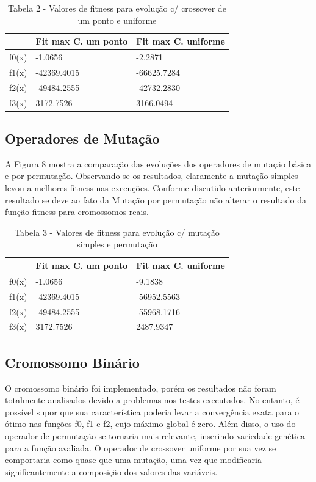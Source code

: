 \documentclass[conference]{IEEEtran}
\begin{document}
\begin{table}[]
\begin{tabular}{|l|l|l|}
\hline
      & Fit max C. um ponto & Fit max C. uniforme \\ \hline
f0(x) & -1.0656             & -2.2871             \\ \hline
f1(x) & -42369.4015         & -66625.7284         \\ \hline
f2(x) & -49484.2555         & -42732.2830         \\ \hline
f3(x) & 3172.7526           & 3166.0494           \\ \hline
\end{tabular}
\caption*{Tabela 2 - Valores de fitness para evolução c/ crossover de um ponto e uniforme}
\end{table}

\subsection{Operadores de Mutação}
A Figura 8 mostra a comparação das evoluções dos operadores de mutação básica e
por permutação. Observando-se os resultados, claramente a mutação simples levou 
a melhores fitness nas execuções. Conforme discutido anteriormente, este 
resultado se deve ao fato da Mutação por permutação não alterar o resultado da 
função fitness para cromossomos reais.\\

\begin{table}[]
\begin{tabular}{|l|l|l|}
\hline
      & Fit max C. um ponto & Fit max C. uniforme \\ \hline
f0(x) & -1.0656             & -9.1838             \\ \hline
f1(x) & -42369.4015         & -56952.5563         \\ \hline
f2(x) & -49484.2555         & -55968.1716         \\ \hline
f3(x) & 3172.7526           & 2487.9347           \\ \hline
\end{tabular}
\caption*{Tabela 3 - Valores de fitness para evolução c/ mutação simples e permutação}
\end{table}


\subsection{Cromossomo Binário}
O cromossomo binário foi implementado, porém os resultados não foram totalmente 
analisados devido a problemas nos testes executados. 
No entanto, é possível supor que sua característica poderia levar a convergência
exata para o ótimo nas funções f0, f1 e f2, cujo máximo global é zero.
Além disso, o uso do operador de permutação se tornaria mais relevante,
inserindo variedade genética para a função avaliada.
O operador de crossover uniforme por sua vez se comportaria como quase que uma 
mutação, uma vez que modificaria significantemente a composição dos valores das 
variáveis.
\end{document}
